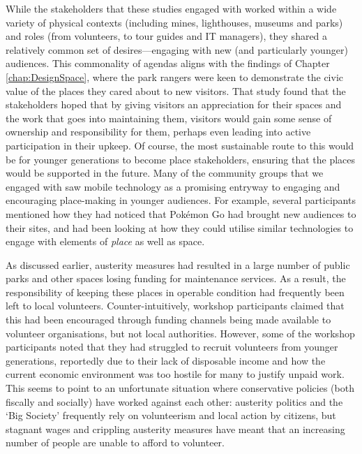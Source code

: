 While the stakeholders that these studies engaged with worked within a wide variety of physical contexts (including mines, lighthouses, museums and parks) and roles (from volunteers, to tour guides and IT managers), they shared a relatively common set of desires---engaging with new (and particularly younger) audiences. This commonality of agendas aligns with the findings of Chapter \ref{chap:DesignSpace}, where the park rangers were keen to demonstrate the civic value of the places they cared about to new visitors. That study found that the stakeholders hoped that by giving visitors an appreciation for their spaces and the work that goes into maintaining them, visitors would gain some sense of ownership and responsibility for them, perhaps even leading into active participation in their upkeep. Of course, the most sustainable route to this would be for younger generations to become place stakeholders, ensuring that the places would be supported in the future. Many of the community groups that we engaged with saw mobile technology as a promising entryway to engaging and encouraging place-making in younger audiences. For example, several participants mentioned how they had noticed that Pok\'emon Go had brought new audiences to their sites, and had been looking at how they could utilise similar technologies to engage with elements of \textit{place} as well as space.

As discussed earlier, austerity measures had resulted in a large number of public parks and other spaces losing funding for maintenance services. As a result, the responsibility of keeping these places in operable condition had frequently been left to local volunteers. Counter-intuitively, workshop participants claimed that this had been encouraged through funding channels being made available to volunteer organisations, but not local authorities. However, some of the workshop participants noted that they had struggled to recruit volunteers from younger generations, reportedly due to their lack of disposable income and how the current economic environment was too hostile for many to justify unpaid work. This seems to point to an unfortunate situation where conservative policies (both fiscally and socially) have worked against each other: austerity politics and the `Big Society' frequently rely on volunteerism and local action by citizens, but stagnant wages and crippling austerity measures have meant that an increasing number of people are unable to afford to volunteer.

